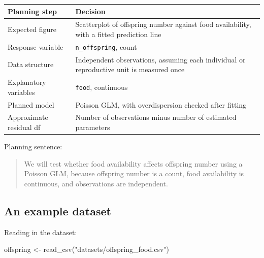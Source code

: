 \documentclass[
  letterpaper,
  8pt,
  a4paper]{book}
\newenvironment{Shaded}{\begin{snugshade}}{\end{snugshade}}
\newcommand{\FunctionTok}[1]{\textcolor[rgb]{0.28,0.35,0.67}{#1}}
\newcommand{\NormalTok}[1]{\textcolor[rgb]{0.00,0.23,0.31}{#1}}
\newcommand{\OtherTok}[1]{\textcolor[rgb]{0.00,0.23,0.31}{#1}}
\newcommand{\StringTok}[1]{\textcolor[rgb]{0.13,0.47,0.30}{#1}}
\newcounter{none} %
\begin{document}
{\def\LTcaptype{none} %
\begin{longtable}[]{@{}
  >{\raggedright\arraybackslash}p{}
  >{\raggedright\arraybackslash}p{}@{}}
\toprule\noalign{}
\begin{minipage}[b]{\linewidth}\raggedright
Planning step
\end{minipage} & \begin{minipage}[b]{\linewidth}\raggedright
Decision
\end{minipage} \\
\midrule\noalign{}
\endhead
\bottomrule\noalign{}
\endlastfoot
Expected figure & Scatterplot of offspring number against food
availability, with a fitted prediction line \\
Response variable & \texttt{n\_offspring}, count \\
Data structure & Independent observations, assuming each individual or
reproductive unit is measured once \\
Explanatory variables & \texttt{food}, continuous \\
Planned model & Poisson GLM, with overdispersion checked after
fitting \\
Approximate residual df & Number of observations minus number of
estimated parameters \\
\end{longtable}
}

Planning sentence:

\begin{quote}
We will test whether food availability affects offspring number using a
Poisson GLM, because offspring number is a count, food availability is
continuous, and observations are independent.
\end{quote}

\subsection*{An example dataset}\label{an-example-dataset-4}

Reading in the dataset:

\begin{Shaded}
\begin{Highlighting}[]
\NormalTok{offspring }\OtherTok{\textless{}{-}} \FunctionTok{read\_csv}\NormalTok{(}\StringTok{"datasets/offspring\_food.csv"}\NormalTok{)}
\end{Highlighting}
\end{Shaded}
\end{document}
